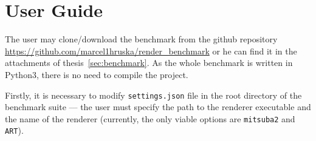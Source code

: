 \documentclass[12pt,a4paper]{report}
\begin{document}



\tableofcontents














\appendix
\chapter{User Guide}

The user may clone/download the benchmark from the github repository \url{https://github.com/marcel1hruska/render_benchmark} or he can find it in the attachments of thesis~\ref{sec:benchmark}. As the whole benchmark is written in Python3, there is no need to compile the project. 

Firstly, it is necessary to modify \texttt{settings.json} file in the root directory of the benchmark suite --- the user must specify the path to the renderer executable and the name of the renderer (currently, the only viable options are \texttt{mitsuba2} and \texttt{ART}).
\end{document}
